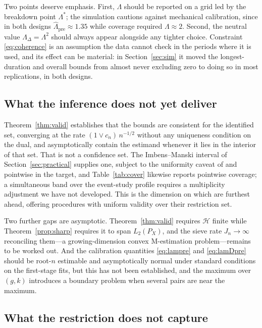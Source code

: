 \documentclass[12pt]{article}
\theoremstyle{remark}
\begin{document}
Two points deserve emphasis. First, $\Lambda$ should be reported on a grid led by the
breakdown point $\Lambda^{*}$; the simulation cautions against mechanical calibration,
since in both designs $\widehat\Lambda_{\mathrm{pre}} \approx 1.35$ while coverage
required $\Lambda \approx 2$. Second, the neutral value $\Lambda_\Delta = \Lambda^{2}$
should always appear alongside any tighter choice. Constraint \eqref{eq:coherence} is an
assumption the data cannot check in the periods where it is used, and its effect can be
material: in Section~\ref{sec:sim} it moved the longest-duration and overall bounds from
almost never excluding zero to doing so in most replications, in both designs.

\subsection{What the inference does not yet deliver}

Theorem~\ref{thm:valid} establishes that the bounds are consistent for the identified set,
converging at the rate $(1 \vee c_n)\,n^{-1/2}$ without any uniqueness condition on the dual, and
asymptotically contain the estimand whenever it lies in the interior of that set. That is
not a confidence set. The
Imbens--Manski interval of Section~\ref{sec:practical} supplies one, subject to the
uniformity caveat of \citet{stoye2009more} and pointwise in the target, and
Table~\ref{tab:cover} likewise reports pointwise coverage; a simultaneous band over the
event-study profile requires a multiplicity adjustment we have not developed.
This is the dimension on which \citet{rambachan2023honest} are furthest ahead, offering
procedures with uniform validity over their restriction set.

Two further gaps are asymptotic. Theorem~\ref{thm:valid} requires $\mathcal{H}$ finite
while Theorem~\ref{prop:sharp} requires it to span $L_2(P_X)$, and the sieve rate
$J_n \to \infty$ reconciling them---a growing-dimension convex M-estimation
problem---remains to be worked out. And the calibration quantities \eqref{eq:lampre} and
\eqref{eq:lamDpre} should be root-$n$ estimable and asymptotically normal under standard
conditions on the first-stage fits, but this has not been established, and the maximum
over $(g,k)$ introduces a boundary problem when several pairs are near the maximum.

\subsection{What the restriction does not capture}
\end{document}
